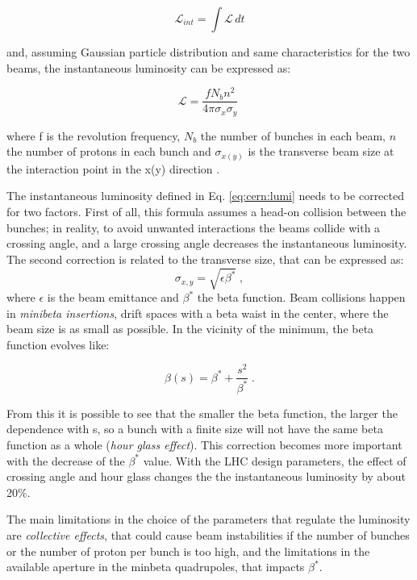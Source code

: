\begin{equation}
\label{eq:cern:intlumi}
\mathcal{L}_{int} = \int \mathcal{L} \, dt
\end{equation}

and, assuming Gaussian particle distribution and same characteristics for the two beams, the instantaneous luminosity can be expressed as:

\begin{equation}
\mathcal{L}=\frac{f N_b n^2}{4 \pi \sigma_{x}\sigma_{y} } \;
\label{eq:cern:lumi}
\end{equation}

where f is the revolution frequency, $N_b$ the number of bunches in each beam, $n$ the number of protons in each bunch and $\sigma_{x(y)}$  is the transverse beam size at the interaction point in the x(y) direction . 

The instantaneous luminosity defined in Eq. \ref{eq:cern:lumi} needs to be corrected for two factors. First of all, this formula assumes a head-on collision between the bunches; in reality, to avoid unwanted interactions the beams collide with a crossing angle, and a large crossing angle decreases the instantaneous luminosity. The second correction is related to the transverse size, that can be expressed as:
\begin{equation}
\sigma_{x,y} = \sqrt{  \epsilon \beta^* } \; ,
\end{equation}
where $\epsilon$ is the beam emittance and $\beta^*$ the beta function. Beam collisions happen in \textit{minibeta insertions}, drift spaces with a beta waist in the center, where the beam size is as small as possible. In the vicinity of the minimum, the beta function evolves like:

\begin{equation}
\beta(s) = \beta^* + \frac{s^2}{\beta^*} \; .
\end{equation}

From this it is possible to see that the smaller the beta function, the larger the dependence with s, so a bunch with a finite size will not have the same beta function as a whole (\textit{hour glass effect}). This correction becomes more important with the decrease of the $\beta^*$ value. With the LHC design parameters, the effect of crossing angle and hour glass changes the the instantaneous luminosity by about 20\%.

The main limitations in the choice of the parameters that regulate the luminosity are \textit{collective effects}, that could cause beam instabilities if the number of bunches or the number of proton per bunch is too high, and the limitations in the available aperture in the minbeta quadrupoles, that impacts $\beta^*$.

